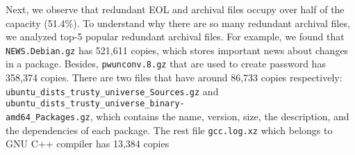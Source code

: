 Next, we observe that redundant EOL and archival files occupy over half of the
capacity (51.4\%). 
%
To understand why there are so many redundant archival files, 
%
we analyzed top-5 popular redundant archival files.
For example, we found that \texttt{NEWS.Debian.gz} has 521,611 copies,
which stores important news about changes in a package.
Besides, \texttt{pwunconv.8.gz} that are used to create password has 358,374 copies.
There are two files that have around 86,733 copies respectively:
\texttt{ubuntu\_dists\_trusty\_universe\_Sources.gz} and
\texttt{ubuntu\_dists\_trusty\_universe\_binary-\\amd64\_Packages.gz}, which
contains the name, version, size, the description, and the dependencies of each package.
%
The rest file \texttt{gcc.log.xz} which belongs to GNU C++ compiler
 has 13,384 copies
%
%
%
%
%
 

%
%

